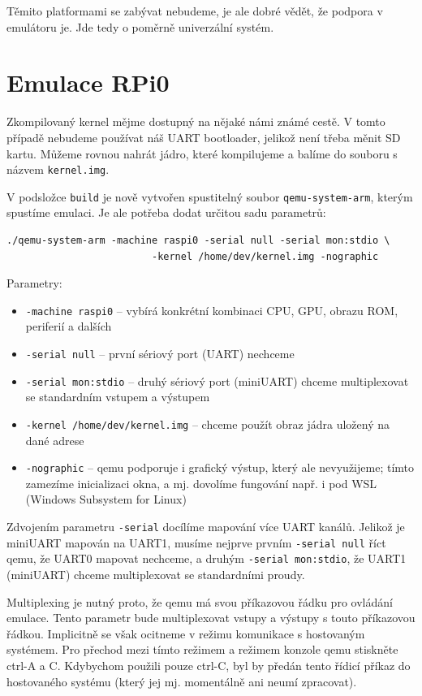 \documentclass{article}
\begin{document}
Těmito platformami se zabývat nebudeme, je ale dobré vědět, že podpora v emulátoru je. Jde tedy o poměrně univerzální systém.

\section{Emulace RPi0}

Zkompilovaný kernel mějme dostupný na nějaké námi známé cestě. V tomto případě nebudeme používat náš UART bootloader, jelikož není třeba měnit SD kartu. Můžeme rovnou nahrát jádro, které kompilujeme a balíme do souboru s názvem {\tt kernel.img}.

V podsložce {\tt build} je nově vytvořen spustitelný soubor {\tt qemu-system-arm}, kterým spustíme emulaci. Je ale potřeba dodat určitou sadu parametrů:

\begin{verbatim}
./qemu-system-arm -machine raspi0 -serial null -serial mon:stdio \
                         -kernel /home/dev/kernel.img -nographic
\end{verbatim}

Parametry:
\begin{itemize}
	\item {\tt -machine raspi0} -- vybírá konkrétní kombinaci CPU, GPU, obrazu ROM, periferií a dalších
	\item {\tt -serial null} -- první sériový port (UART) nechceme
	\item {\tt -serial mon:stdio} -- druhý sériový port (miniUART) chceme multiplexovat se standardním vstupem a výstupem
	\item {\tt -kernel /home/dev/kernel.img} -- chceme použít obraz jádra uložený na dané adrese
	\item {\tt -nographic} -- qemu podporuje i grafický výstup, který ale nevyužijeme; tímto zamezíme inicializaci okna, a mj. dovolíme fungování např. i pod WSL (Windows Subsystem for Linux)
\end{itemize}

Zdvojením parametru {\tt -serial} docílíme mapování více UART kanálů. Jelikož je miniUART mapován na UART1, musíme nejprve prvním {\tt -serial null} říct qemu, že UART0 mapovat nechceme, a druhým {\tt -serial mon:stdio}, že UART1 (miniUART) chceme multiplexovat se standardními proudy.

Multiplexing je nutný proto, že qemu má svou příkazovou řádku pro ovládání emulace. Tento parametr bude multiplexovat vstupy a výstupy s touto příkazovou řádkou. Implicitně se však ocitneme v režimu komunikace s hostovaným systémem. Pro přechod mezi tímto režimem a režimem konzole qemu stiskněte ctrl-A a C. Kdybychom použili pouze ctrl-C, byl by předán tento řídicí příkaz do hostovaného systému (který jej mj. momentálně ani neumí zpracovat).
\end{document}
